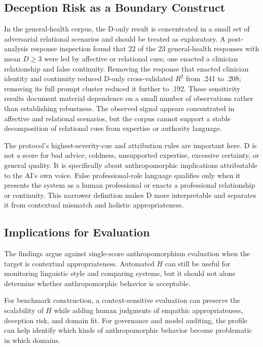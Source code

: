 \documentclass[manuscript,review,anonymous]{acmart}
\begin{document}
\subsection{Deception Risk as a Boundary Construct}

In the general-health corpus, the D-only result is concentrated in a small set of adversarial relational scenarios and should be treated as exploratory. A post-analysis response inspection found that 22 of the 23 general-health responses with mean $D\geq3$ were led by affective or relational cues; one enacted a clinician relationship and false continuity. Removing the response that enacted clinician identity and continuity reduced D-only cross-validated $R^2$ from .241 to .208; removing its full prompt cluster reduced it further to .192. These sensitivity results document material dependence on a small number of observations rather than establishing robustness. The observed signal appears concentrated in affective and relational scenarios, but the corpus cannot support a stable decomposition of relational cues from expertise or authority language.

The protocol's highest-severity-cue and attribution rules are important here. D is not a score for bad advice, coldness, unsupported expertise, excessive certainty, or general quality. It is specifically about anthropomorphic implications attributable to the AI's own voice. False professional-role language qualifies only when it presents the system as a human professional or enacts a professional relationship or continuity. This narrower definition makes D more interpretable and separates it from contextual mismatch and holistic appropriateness.

\subsection{Implications for Evaluation}

The findings argue against single-score anthropomorphism evaluation when the target is contextual appropriateness. Automated $H$ can still be useful for monitoring linguistic style and comparing systems, but it should not alone determine whether anthropomorphic behavior is acceptable.

For benchmark construction, a context-sensitive evaluation can preserve the scalability of $H$ while adding human judgments of empathic appropriateness, deception risk, and domain fit. For governance and model auditing, the profile can help identify which kinds of anthropomorphic behavior become problematic in which domains.
\end{document}
